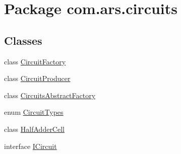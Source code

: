 \hypertarget{namespacecom_1_1ars_1_1circuits}{}\section{Package com.\+ars.\+circuits}
\label{namespacecom_1_1ars_1_1circuits}
\subsection*{Classes}
\begin{DoxyCompactItemize}
\item 
class \hyperlink{classcom_1_1ars_1_1circuits_1_1_circuit_factory}{Circuit\+Factory}
\item 
class \hyperlink{classcom_1_1ars_1_1circuits_1_1_circuit_producer}{Circuit\+Producer}
\item 
class \hyperlink{classcom_1_1ars_1_1circuits_1_1_circuits_abstract_factory}{Circuits\+Abstract\+Factory}
\item 
enum \hyperlink{enumcom_1_1ars_1_1circuits_1_1_circuit_types}{Circuit\+Types}
\item 
class \hyperlink{classcom_1_1ars_1_1circuits_1_1_half_adder_cell}{Half\+Adder\+Cell}
\item 
interface \hyperlink{interfacecom_1_1ars_1_1circuits_1_1_i_circuit}{I\+Circuit}
\end{DoxyCompactItemize}
